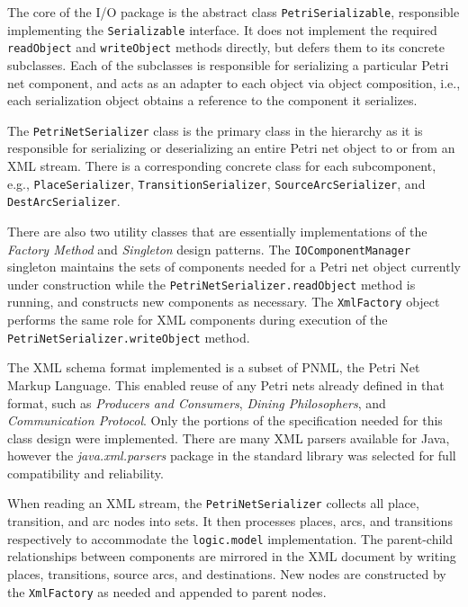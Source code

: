 The core of the I/O package is the abstract class \texttt{PetriSerializable},
responsible implementing the \texttt{Serializable} interface. It does not implement
the required \texttt{readObject} and \texttt{writeObject} methods directly, but
defers them to its concrete subclasses. Each of the subclasses is responsible
for serializing a particular Petri net component, and acts as an adapter to each
object via object composition, i.e., each serialization object obtains a reference
to the component it serializes.

The \texttt{PetriNetSerializer} class is the primary class in the hierarchy as it
is responsible for serializing or deserializing an entire Petri net object to
or from an XML stream. There is a corresponding concrete class for each
subcomponent, e.g., \texttt{PlaceSerializer}, \texttt{TransitionSerializer},
\texttt{SourceArcSerializer}, and \texttt{DestArcSerializer}.

There are also two utility classes that are essentially implementations of the
\textit{Factory Method} and \textit{Singleton} design patterns. The \texttt{IOComponentManager} singleton maintains the sets of components needed
for a Petri net object currently under construction while the \texttt{PetriNetSerializer.readObject}
method is running, and constructs new components as necessary. The
\texttt{XmlFactory} object performs the same role for XML components during
execution of the \texttt{PetriNetSerializer.writeObject} method.

The XML schema format implemented is a subset of PNML, the Petri Net Markup
Language. This enabled reuse of any Petri nets already defined in that format,
such as \textit{Producers and Consumers}, \textit{Dining Philosophers}, and
\textit{Communication Protocol}. Only the portions of the specification needed
for this class design were implemented. There are many XML parsers available for
Java, however the \textit{java.xml.parsers} package in the standard library
was selected for full compatibility and reliability.

When reading an XML stream, the \texttt{PetriNetSerializer} collects all place,
transition, and arc nodes into sets. It then processes places, arcs, and
transitions respectively to accommodate the \texttt{logic.model} implementation.
The parent-child relationships between components are mirrored in the XML document
by writing places, transitions, source arcs, and destinations. New nodes are
constructed by the \texttt{XmlFactory} as needed and appended to parent nodes.

